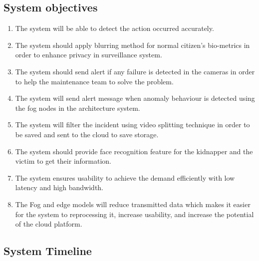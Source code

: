 \documentclass[12pt]{article}
\begin{document}
\subsection{System objectives}
\begin{enumerate}


\item The system will be able to detect the action occurred accurately.

\item The system should apply blurring method for normal citizen’s bio-metrics in order to enhance privacy in surveillance system.
\item The system should send alert if any failure is detected in the cameras in order to help the maintenance team to solve the problem.
\item The system will send alert message when anomaly behaviour is detected using the fog nodes in the architecture system.

\item The system will filter the incident using video splitting technique in order to be saved and sent to the cloud to save storage.

\item The system should provide face recognition feature for the kidnapper and the victim to get their information.
\item The system ensures usability to achieve the demand efficiently with low latency and high bandwidth.
\item The Fog and edge models will reduce transmitted data which makes it easier for the system to reprocessing it, increase usability, and increase the potential of the cloud platform.

 \end{enumerate}
 \newpage
\subsection {System Timeline}
\end{document}
